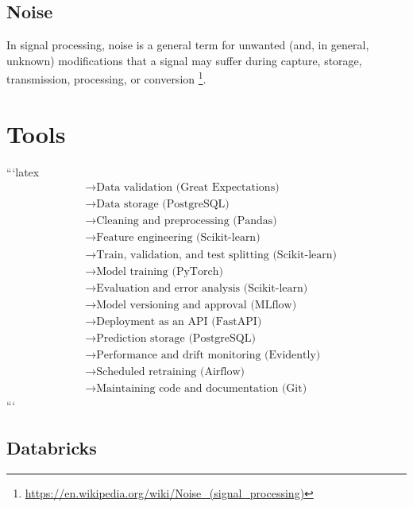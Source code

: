 \documentclass{book}
\providecommand{\seeherefooter}[1]{\footnote{\url{#1}}}
\begin{document}
\subsection{Noise}


In signal processing, noise is a general term for unwanted (and, in general, unknown) modifications that a signal may suffer during capture, storage, transmission, processing, or conversion \seeherefooter{https://en.wikipedia.org/wiki/Noise_(signal_processing)}.

\section{Tools}


```latex
    \begin{align*}
        &\longrightarrow \text{Data validation (Great Expectations)} \\
        &\longrightarrow \text{Data storage (PostgreSQL)} \\
        &\longrightarrow \text{Cleaning and preprocessing (Pandas)} \\
        &\longrightarrow \text{Feature engineering (Scikit-learn)} \\
        &\longrightarrow \text{Train, validation, and test splitting (Scikit-learn)} \\
        &\longrightarrow \text{Model training (PyTorch)} \\
        &\longrightarrow \text{Evaluation and error analysis (Scikit-learn)} \\
        &\longrightarrow \text{Model versioning and approval (MLflow)} \\
        &\longrightarrow \text{Deployment as an API (FastAPI)} \\
        &\longrightarrow \text{Prediction storage (PostgreSQL)} \\
        &\longrightarrow \text{Performance and drift monitoring (Evidently)} \\
        &\longrightarrow \text{Scheduled retraining (Airflow)} \\
        &\longrightarrow \text{Maintaining code and documentation (Git)}
    \end{align*}
    ```
    
%    
%

\subsection{Databricks}
\end{document}
